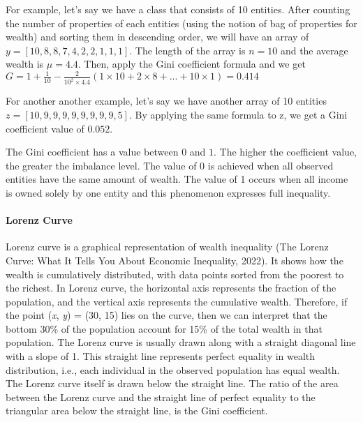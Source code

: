 For example, let's say we have a class that consists of 10 entities. After counting the number of properties of each entities (using the notion of bag of properties for wealth) and sorting them in descending order, we will have an array of \(y = [10,8,8,7,4,2,2,1,1,1]\). The length of the array is \(n = 10\) and the average wealth is \(\mu = 4.4\). Then, apply the Gini coefficient formula and we get \(G = 1 + \frac{1}{10} - \frac{2}{10^{2}\times4.4}(1\times10 + 2\times8 + ... + 10\times1) = 0.414\)

For another another example, let's say we have another array of 10 entities \(z = [10, 9, 9, 9, 9, 9, 9, 9, 9, 5]\). By applying the same formula to z, we get a Gini coefficient value of \(0.052\).

The Gini coefficient has a value between \(0\) and \(1\). The higher the coefficient value, the greater the imbalance level. The value of 0 is achieved when all observed entities have the same amount of wealth. The value of 1 occurs when all income is owned solely by one entity and this phenomenon expresses full inequality.


\paragraph{Lorenz Curve} Lorenz curve is a graphical representation of wealth inequality (The Lorenz Curve: What It Tells You About Economic Inequality, 2022). It shows how the wealth is cumulatively distributed, with data points sorted from the poorest to the richest. In Lorenz curve, the horizontal axis represents the fraction of the population, and the vertical axis represents the cumulative wealth. Therefore, if the point (\textit{x}, \textit{y}) = (30, 15) lies on the curve, then we can interpret that the bottom 30\% of the population account for 15\% of the total wealth in that population. The Lorenz curve is usually drawn along with a straight diagonal line with a slope of 1. This straight line represents perfect equality in wealth distribution, i.e., each individual in the observed population has equal wealth. The Lorenz curve itself is drawn below the straight line. The ratio of the area between the Lorenz curve and the straight line of perfect equality to the triangular area below the straight line, is the Gini coefficient.